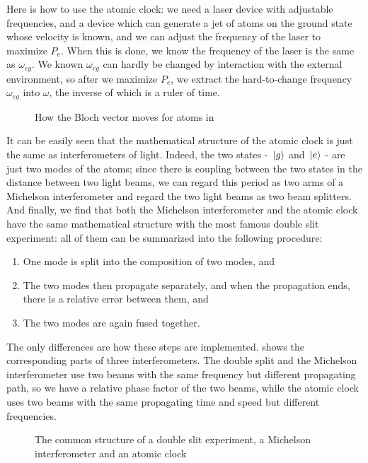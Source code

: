 \documentclass[hyperref, a4paper]{article}
\begin{document}
Here is how to use the atomic clock: we need a laser device with adjustable frequencies, and a device which 
can generate a jet of atoms on the ground state whose velocity is known, and we can adjust the frequency 
of the laser to maximize $P_e$. When this is done, we know the frequency of the laser is the same as $\omega_{eg}$.
We known $\omega_{eg}$ can hardly be changed by interaction with the external environment, so after we maximize 
$P_e$, we extract the hard-to-change frequency $\omega_{eg}$ into $\omega$, the inverse of which is a ruler of time.

\begin{figure}
    \centering
    
    \caption{How the Bloch vector moves for atoms in }
    \label{fig:bloch-vector}
\end{figure}

It can be easily seen that the mathematical structure of the atomic clock is just the same as interferometers
of light. Indeed, the two states - $\ket*{g}$ and $\ket*{e}$ - are just two modes of the atoms; since there is 
coupling between the two states in the distance between two light beams, we can regard this period as two 
arms of a Michelson interferometer and regard the two light beams as two beam splitters. And finally, we find 
that both the Michelson interferometer and the atomic clock have the same mathematical structure with 
the most famous double slit experiment: all of them can be summarized into the following procedure:
\begin{enumerate}
    \item One mode is split into the composition of two modes, and
    \item The two modes then propagate separately, and when the propagation ends, there is a relative error between them, and
    \item The two modes are again fused together. 
\end{enumerate}
The only differences are how these steps are implemented.  shows the corresponding 
parts of three interferometers. The double split and the Michelson interferometer use two beams with the same 
frequency but different propagating path, so we have a relative phase factor of the two beams, while the atomic
clock uses two beams with the same propagating time and speed but different frequencies.

\begin{figure}
    \centering
    
    \caption{The common structure of a double slit experiment, a Michelson interferometer and an atomic clock}
    \label{fig:same-structure}
\end{figure}
\end{document}
